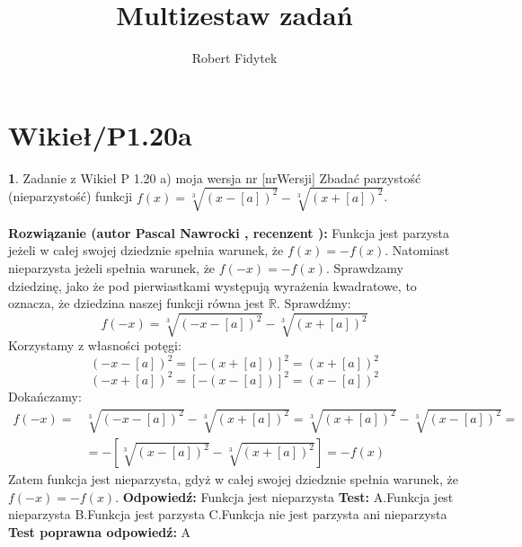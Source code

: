 \documentclass[12pt, a4paper]{article}
\title{Multizestaw zadań}
\author{Robert Fidytek}
\date{}
\theoremstyle{definition} %
\newtheorem{zad}{}
\newcommand{\kategoria}[1]{\section{#1}} %
\newcommand{\zadStart}[1]{\begin{zad}#1\newline} %
\newcommand{\zadStop}{\end{zad}}   %
\newcommand{\rozwStart}[2]{\noindent \textbf{Rozwiązanie (autor #1 , recenzent #2): }\newline} %
\newcommand{\rozwStop}{\newline}                                            %
\newcommand{\odpStart}{\noindent \textbf{Odpowiedź:}\newline}    %
\newcommand{\odpStop}{\newline}                                             %
\newcommand{\testStart}{\noindent \textbf{Test:}\newline} %
\newcommand{\testStop}{\newline} %
\newcommand{\kluczStart}{\noindent \textbf{Test poprawna odpowiedź:}\newline} %
\newcommand{\kluczStop}{\newline} %
\begin{document}
\maketitle



\kategoria{Wikieł/P1.20a}
\zadStart{Zadanie z Wikieł P 1.20 a) moja wersja nr [nrWersji]}
Zbadać parzystość (nieparzystość) funkcji $f(x)=\sqrt[3]{(x-[a])^2}-\sqrt[3]{(x+[a])^2}$.
\zadStop
\rozwStart{Pascal Nawrocki}{}
Funkcja jest parzysta jeżeli w całej swojej dziedznie spełnia warunek, że $f(x)=-f(x)$. Natomiast nieparzysta jeżeli spełnia warunek, że $f(-x)=-f(x)$.
Sprawdzamy dziedzinę, jako że pod pierwiastkami występują wyrażenia kwadratowe, to oznacza, że dziedzina naszej funkcji równa jest $ \mathbb{R}$.
Sprawdźmy:
$$f(-x)=\sqrt[3]{(-x-[a])^2}-\sqrt[3]{(x+[a])^2}$$
Korzystamy z własności potęgi:
$$(-x-[a])^2=[-(x+[a])]^2=(x+[a])^2$$
$$(-x+[a])^2=[-(x-[a])]^2=(x-[a])^2$$
Dokańczamy:
\begin{equation}
\begin{split}
f(-x)=&\sqrt[3]{(-x-[a])^2}-\sqrt[3]{(x+[a])^2}=\sqrt[3]{(x+[a])^2}-\sqrt[3]{(x-[a])^2}=\\
&=-[\sqrt[3]{(x-[a])^2}-\sqrt[3]{(x+[a])^2}]=-f(x)
\end{split}
\end{equation}
Zatem funkcja jest nieparzysta, gdyż w całej swojej dziedznie spełnia warunek, że $f(-x)=-f(x)$.
\rozwStop
\odpStart
 Funkcja jest nieparzysta
\odpStop
\testStart
A.Funkcja jest nieparzysta
B.Funkcja jest parzysta
C.Funkcja nie jest parzysta ani nieparzysta
\testStop
\kluczStart
A
\kluczStop
\end{document}
